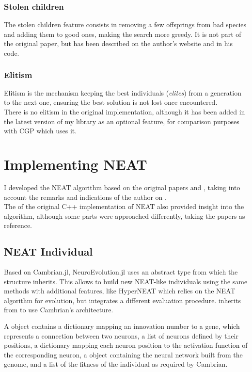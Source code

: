 \subsubsection{Stolen children}
The stolen children feature consists in removing a few offsprings from bad species and adding them to good ones, making the search more greedy. It is not part of the original paper, but has been described on the author's website and in his code.

\subsubsection{Elitism}
\label{subsec:elitism}
Elitism is the mechanism keeping the best individuals (\textit{elites}) from a generation to the next one, ensuring the best solution is not lost once encountered. \\
There is no elitism in the original implementation, although it has been added in the latest version of my library as an optional feature, for comparison purposes with CGP which uses it.

\section{Implementing NEAT}
I developed the NEAT algorithm based on the original papers \cite{NEAT_1} and \cite{NEAT_2}, taking into account the remarks and indications of the author on . \\
The  of the original C++ implementation of NEAT also provided insight into the algorithm, although some parts were approached differently, taking the papers as reference.

\subsection{NEAT Individual}

Based on Cambrian.jl, NeuroEvolution.jl uses an abstract type  from which the structure  inherits. This allows to build new NEAT-like individuals using the same methods with additional features, like HyperNEAT which relies on the NEAT algorithm for evolution, but integrates a different evaluation procedure.  inherits from  to use Cambrian's architecture.

A  object contains a dictionary mapping an innovation number to a gene, which represents a connection between two neurons, a list of neurons defined by their positions, a dictionary mapping each neuron position to the activation function of the corresponding neuron, a  object containing the neural network built from the genome, and a list of the fitness of the individual as required by Cambrian.

